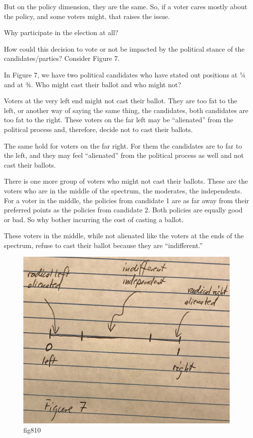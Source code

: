 \documentclass[
]{book}
\begin{document}
But on the policy dimension, they are the same. So, if a voter cares mostly about the policy, and some voters might, that raises the issue.

Why participate in the election at all?

How could this decision to vote or not be impacted by the political stance of the candidates/parties?
Consider Figure 7.

In Figure 7, we have two political candidates who have stated out positions at ¼ and at ¾. Who might cast their ballot and who might not?

Voters at the very left end might not cast their ballot. They are too fat to the left, or another way of saying the same thing, the candidates, both candidates are too fat to the right. These voters on the far left may be ``alienated'' from the political process and, therefore, decide not to cast their ballots.

The same hold for voters on the far right. For them the candidates are to far to the left, and they may feel ``alienated'' from the political process as well and not cast their ballots.

There is one more group of voters who might not cast their ballots. These are the voters who are in the middle of the spectrum, the moderates, the independents. For a voter in the middle, the policies from candidate 1 are as far away from their preferred points as the policies from candidate 2. Both policies are equally good or bad. So why bother incurring the cost of casting a ballot.

These voters in the middle, while not alienated like the voters at the ends of the spectrum, refuse to cast their ballot because they are ``indifferent.''

\begin{figure}

{\centering \includegraphics[width=0.5\linewidth]{img/ch8/fig10} 

}

\caption{fig810}\label{fig:fig810}
\end{figure}
\end{document}
